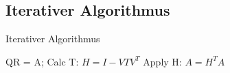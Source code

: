 \subsection{Iterativer Algorithmus}
\begin{algorithm}[H]
	\caption{Iterativer Algorithmus}
	\label{alg::italg}
	\begin{algorithmic}
			\State QR = A;
				\State Calc T: $H=I-VTV^T$
				\State Apply H: $A=H^TA$
			\EndIf
		\EndFor
	\end{algorithmic}
\end{algorithm}
